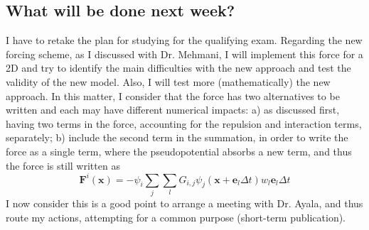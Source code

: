 \documentclass[12pt]{article}
\begin{document}
	\subsection*{What will be done next week?}
	I have to retake the plan for studying for the qualifying exam. Regarding the new forcing scheme, as I discussed with Dr. Mehmani, I will implement this force for a 2D and try to identify the main difficulties with the new approach and test the validity of the new model. Also, I will test more (mathematically)  the new approach. In this matter, I consider that the force has two alternatives to be written and each may have different numerical impacts: a) as discussed first, having two terms in the force, accounting for the repulsion and interaction terms, separately; b) include the second term in the summation, in order to write the force as a single term, where the pseudopotential absorbs a new term, and thus the force is still written as 
	\begin{equation*}
		\mathbf{F}^i (\mathbf{x}) = - \psi_i \sum_j \sum_l G_{i,j} \psi_j (\mathbf{x} + \mathbf{e}_l \Delta t) w_l \mathbf{e}_l \Delta t
	\end{equation*}
	I now consider this is a good point to arrange a meeting with Dr. Ayala, and thus route my actions, attempting for a common purpose (short-term publication). 
	\printbibliography %
\end{document}
